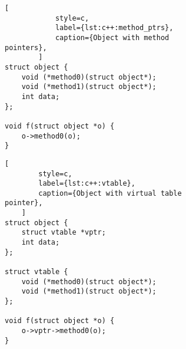 \begin{figure}[ht]
    \centering
    \begin{subfigure}[t]{0.5\textwidth}
        \begin{lstlisting}[
            style=c,
            label={lst:c++:method_ptrs},
            caption={Object with method pointers},
        ]
struct object {
    void (*method0)(struct object*);
    void (*method1)(struct object*);
    int data;
};

void f(struct object *o) {
    o->method0(o);
}
        \end{lstlisting}
    \end{subfigure}
    \begin{subfigure}[t]{0.45\textwidth}
        \begin{lstlisting}[
        style=c,
        label={lst:c++:vtable},
        caption={Object with virtual table pointer},
    ]
struct object {
    struct vtable *vptr;
    int data;
};

struct vtable {
    void (*method0)(struct object*);
    void (*method1)(struct object*);
};

void f(struct object *o) {
    o->vptr->method0(o);
}
        \end{lstlisting}
    \end{subfigure}
\end{figure}

